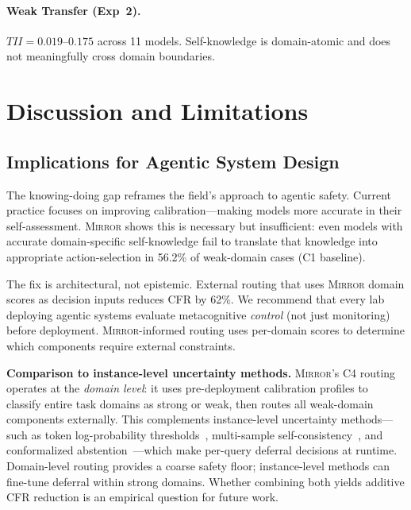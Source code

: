 \documentclass[10pt]{article}
\newcommand{\mirror}{\textsc{Mirror}}
\newcommand{\CFR}{CFR}
\newcommand{\TII}{TII}
\begin{document}
\paragraph{Weak Transfer (Exp~2).}
$\TII{} = 0.019$--$0.175$ across 11 models. Self-knowledge is domain-atomic and does not meaningfully cross domain boundaries.

\section{Discussion and Limitations}
\label{sec:discussion}

\subsection{Implications for Agentic System Design}

The knowing-doing gap reframes the field's approach to agentic safety. Current
practice focuses on improving calibration---making models more accurate in their
self-assessment. \mirror{} shows this is necessary but insufficient: even models
with accurate domain-specific self-knowledge fail to translate that knowledge into
appropriate action-selection in 56.2\% of weak-domain cases (C1 baseline).

The fix is architectural, not epistemic. External routing that uses \mirror{}
domain scores as decision inputs reduces \CFR{} by 62\%. We recommend that every
lab deploying agentic systems evaluate metacognitive \textit{control} (not just
monitoring) before deployment. \mirror{}-informed routing uses per-domain scores to determine which components require external constraints.

\textbf{Comparison to instance-level uncertainty methods.} \mirror{}'s C4 routing operates at the \textit{domain level}: it uses pre-deployment calibration profiles to classify entire task domains as strong or weak, then routes all weak-domain components externally. This complements instance-level uncertainty methods---such as token log-probability thresholds~\citep{lin2024generating}, multi-sample self-consistency~\citep{wang2023selfconsistency}, and conformalized abstention~\citep{angelopoulos2021conformal}---which make per-query deferral decisions at runtime. Domain-level routing provides a coarse safety floor; instance-level methods can fine-tune deferral within strong domains. Whether combining both yields additive CFR reduction is an empirical question for future work.
\end{document}
